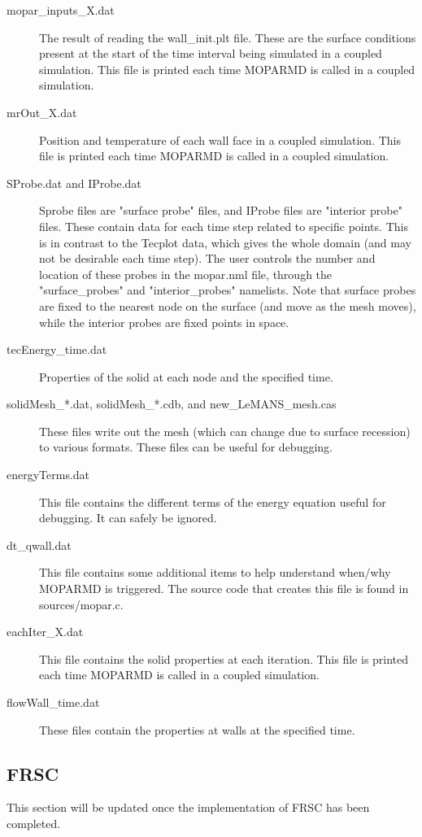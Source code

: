 \documentclass[]{article}
\begin{document}
\begin{description}
\item[mopar\_inputs\_X.dat]  The result of reading the wall\_init.plt file.  These are the surface conditions present at the start of the time interval being simulated in a coupled simulation.  This file is printed each time MOPARMD is called in a coupled simulation.
\item[mrOut\_X.dat]  Position and temperature of each wall face in a coupled simulation. This file is printed each time MOPARMD is called in a coupled simulation.
\item[SProbe.dat and IProbe.dat]  Sprobe files are "surface probe" files, and IProbe files are "interior probe" files. These contain data for each time step related to specific points. This is in contrast to the Tecplot data, which gives the whole domain (and may not be desirable each time step). The user controls the number and location of these probes in the mopar.nml file, through the "surface\_probes" and "interior\_probes" namelists.  Note that surface probes are fixed to the nearest node on the surface (and move as the mesh moves), while the interior probes are fixed points in space.
\item[tecEnergy\_time.dat] Properties of the solid at each node and the specified time.
\item[solidMesh\_*.dat, solidMesh\_*.cdb, and new\_LeMANS\_mesh.cas] These files write out the mesh (which can change due to surface recession) to various formats. These files can be useful for debugging.
\item[energyTerms.dat] This file contains the different terms of the energy equation useful for debugging. It can safely be ignored.
\item[dt\_qwall.dat] This file contains some additional items to help understand when/why MOPARMD is triggered.  The source code that creates this file is found in sources/mopar.c.
\item[eachIter\_X.dat]  This file contains the solid properties at each iteration. This file is printed each time MOPARMD is called in a coupled simulation.
\item[flowWall\_time.dat] These files contain the properties at walls at the specified time.
\end{description}

\subsection{FRSC}
This section will be updated once the implementation of FRSC has been completed.
\end{document}

